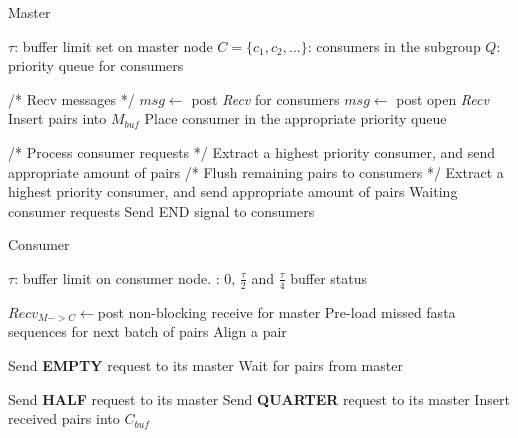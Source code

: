 \documentclass[conference]{IEEEtran}
\begin{document}
\begin{algorithm}
\caption{Master}
\label{ms}
\begin{algorithmic}

    \STATE $\tau$: buffer limit set on master node
    \STATE $C=\{c_1, c_2, ...\}$: consumers in the subgroup
    \STATE $Q$: priority queue for consumers

    \WHILE{\TRUE}
        \STATE /* Recv messages */
            \STATE $msg\leftarrow$ post {\it Recv} for consumers
        \ELSE 
            \STATE $msg\leftarrow$ post open {\it Recv}
                \STATE Insert pairs into $M_{buf}$
                \ENDIF
                \STATE Place consumer in the appropriate priority queue
            \ENDIF
        \ENDIF
        
        \STATE /* Process consumer requests */
            \STATE Extract a highest priority consumer, and send appropriate amount of pairs
        \ENDWHILE
    \ENDWHILE
    \STATE /* Flush remaining pairs to consumers */
                \STATE Extract a highest priority consumer, and send appropriate amount of pairs
            \ELSE
                \STATE Waiting consumer requests
            \ENDIF
    \ENDWHILE
    \STATE Send END signal to consumers
\end{algorithmic}
\end{algorithm}

\begin{algorithm}
\caption{Consumer}
\label{cs}
\begin{algorithmic}

    \STATE $\tau$: buffer limit on consumer node.
    : $0$, $\frac{\tau}{2}$ and $\frac{\tau}{4}$ buffer status
    
    \STATE $Recv_{M->C}\leftarrow$post non-blocking receive for master
    \WHILE {\TRUE} 
            \STATE Pre-load missed fasta sequences for next batch of pairs
            \ELSE 
                \STATE Align a pair
            \ENDIF
        \ENDIF
        
            \STATE Send {\bf EMPTY} request to its master
            \STATE Wait for pairs from master
        \ENDIF

                \STATE Send {\bf HALF} request to its master
                \STATE Send {\bf QUARTER} request to its master
            \ENDIF
        \ELSE
            \STATE Insert received pairs into $C_{buf}$
        \ENDIF
    \ENDWHILE
\end{algorithmic}
\end{algorithm}
\end{document}
